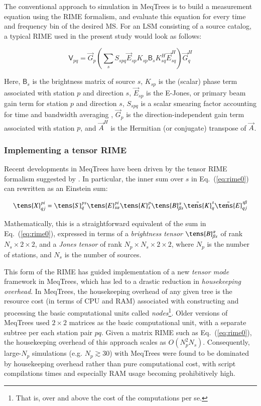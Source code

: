 \documentclass{aa}
\newcommand{\herm}{H}
\newcommand{\jones}[2]{\vec {#1}_{#2}}
\newcommand{\jonesT}[2]{\vec {#1}^{\herm}_{#2}}
\newcommand{\coh}[2]{\mathsf{{#1}}_{{#2}}}
\begin{document}
The conventional approach to simulation in MeqTrees is to build a measurement
equation using the RIME formalism, and evaluate this equation for every time and
frequency bin of the desired MS. For an LSM consisting of a source catalog, a
typical RIME used in the present study would look as follows:

  \begin{equation}\label{eq:rime0}
  \coh{V}{pq} = \jones{G}{p} \left ( \sum_{s} S_{spq} {\jones{E}{sp} K_{sp} \coh{B}{s} K^\herm_{sq} \jonesT{E}{sq}} \right ) \jonesT{G}{q}
  \end{equation}

Here, $\coh{B}{s}$ is the brightness matrix of source $s$, $K_{sp}$ is the (scalar) phase term associated with station $p$  and direction $s$, $\jones{E}{sp}$ is the E-Jones, or primary beam gain term for station $p$ and direction $s$, $S_{spq}$ is a scalar smearing factor accounting for time and bandwidth averaging \citep[implemented as per Eq. (23) of ][]{RRIME1}, $\jones{G}{p}$ is the direction-independent gain term associated with station $p$, and $\jonesT{A}{}$ is the Hermitian (or conjugate) transpose of $\jones{A}{}$.

\subsubsection{Implementing a tensor RIME}

Recent developments in MeqTrees have been driven by the tensor RIME formalism suggested by \citet{RRIME4}. In particular, the inner sum over $s$ in Eq.~(\ref{eq:rime0}) can rewritten as an Einstein sum:

\begin{equation}
\label{eq:trime}
\tens{X}^{pi}_{qj} = 
  \tens{S}_{q}^{ps}\tens{E}_{s\alpha}^{pi}\tens{K}_{s}^{p}
  \tens{B}^\alpha_{\beta s}
  \bar\tens{K}_{q}^{s}
  \bar\tens{E}_{qj}^{s\beta}
\end{equation}

Mathematically, this is a straightforward equivalent of the sum in Eq.~(\ref{eq:rime0}), expressed in terms of a {\em brightness tensor} $\tens{B}^\alpha_{\beta s}$ of rank $N_s\times2\times2$, and a \emph{Jones tensor} of rank $N_p\times N_s\times2\times2$, where $N_p$ is the number of stations, and $N_s$ is the number of sources.

This form of the RIME has guided implementation of a new {\em tensor mode} framework in MeqTrees, which has led to a drastic reduction in {\em housekeeping overhead}. In MeqTrees, the housekeeping overhead of any given tree is the resource cost (in terms of CPU and RAM) associated with constructing and processing the basic computational units called {\em nodes}\footnote{That is, over and above the cost of the computations per se.}. Older versions of MeqTrees used $2\times2$ matrices as the basic computational unit, with a separate subtree per each station pair $pq$. Given a matrix RIME such as Eq.~(\ref{eq:rime0}), the housekeeping overhead of this approach scales as $O(N_p^2 N_s)$. Consequently, large-$N_p$ simulations (e.g. $N_p\gtrsim 30$) with MeqTrees were found to be dominated by housekeeping overhead rather than pure computational cost, with script compilations times and especially RAM usage becoming prohibitively high.
\end{document}
